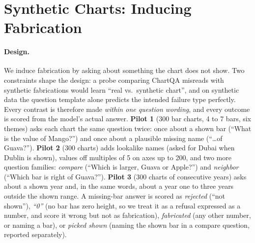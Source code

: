\section{Synthetic Charts: Inducing Fabrication}
\label{sec:synth}

\paragraph{Design.} We induce fabrication by asking about something the chart
does not show. Two constraints shape the design: a probe comparing ChartQA
misreads with synthetic fabrications would learn ``real vs.\ synthetic chart'',
and on synthetic data the question template alone predicts the intended failure
type perfectly. Every contrast is therefore made \emph{within one question
wording}, and every outcome is scored from the model's actual answer.
\textbf{Pilot 1} (300 bar charts, 4 to 7 bars, six themes) asks each chart the same
question twice: once about a shown bar (``What is the value of Mango?'') and once
about a plausible missing name (``\dots of Guava?''). \textbf{Pilot 2} (300
charts) adds lookalike names (asked for Dubai when Dublin is shown), values off
multiples of 5 on axes up to 200, and two more question families:
\emph{compare} (``Which is larger, Guava or Apple?'') and \emph{neighbor}
(``Which bar is right of Guava?''). \textbf{Pilot 3} (300 charts of consecutive
years) asks about a shown year and, in the same words, about a year one to three
years outside the shown range. A missing-bar answer is scored as
\emph{rejected} (``not shown''), \emph{``0''} (no bar has zero height, so we
treat it as a refusal expressed as a number, and score it wrong but not as
fabrication), \emph{fabricated} (any other number, or naming a bar), or
\emph{picked shown} (naming the shown bar in a compare question, reported
separately).

